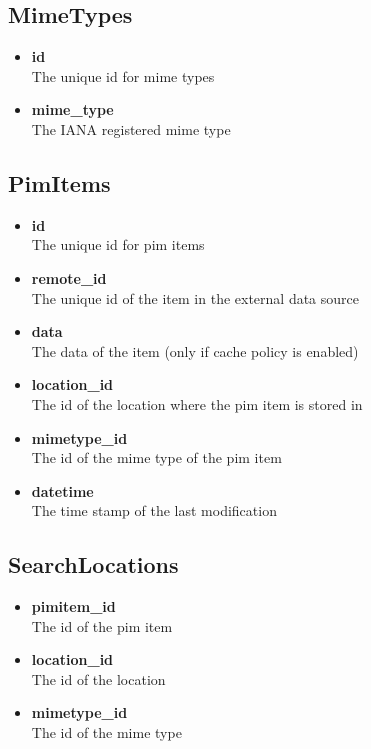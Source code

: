 \documentclass[]{report}
\begin{document}
\subsection{MimeTypes}
\begin{itemize}
  \item \textbf{id}\\
    The unique id for mime types
  \item \textbf{mime\_type}\\
    The IANA registered mime type
\end{itemize}

\subsection{PimItems}
\begin{itemize}
  \item \textbf{id}\\
    The unique id for pim items
  \item \textbf{remote\_id}\\
    The unique id of the item in the external data source
  \item \textbf{data}\\
    The data of the item (only if cache policy is enabled)
  \item \textbf{location\_id}\\
    The id of the location where the pim item is stored in
  \item \textbf{mimetype\_id}\\
    The id of the mime type of the pim item
  \item \textbf{datetime}\\
    The time stamp of the last modification
\end{itemize}

\subsection{SearchLocations}
\begin{itemize}
  \item \textbf{pimitem\_id}\\
    The id of the pim item
  \item \textbf{location\_id}\\
    The id of the location
  \item \textbf{mimetype\_id}\\
    The id of the mime type
\end{itemize}
\end{document}

